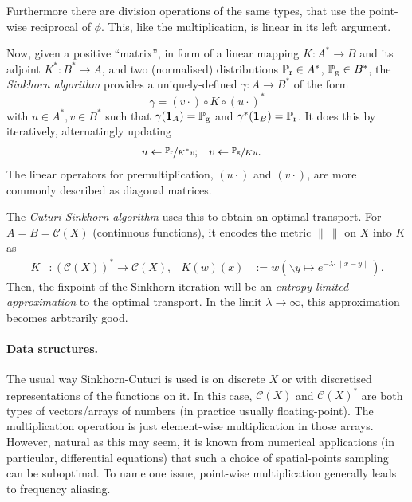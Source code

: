 \documentclass[a4paper]{easychair}
\begin{document}
Furthermore there are division operations of the same types, that use the point-wise reciprocal of $\phi$. This, like the multiplication, is linear in its left argument.

Now, given a positive “matrix”, in form of a linear mapping $K: A^\ast\to B$ and its adjoint $K^\ast: B^\ast\to A$, and two (normalised) distributions $\mathbb{P}_\mathrm{r}\in A^\ast$, $\mathbb{P}_\mathrm{g}\in B^\ast$, the \emph{Sinkhorn algorithm} \cite{SinkhornDiagEquivlc} provides a uniquely-defined $\gamma: A\to B^\ast$ of the form
\[
  \gamma = (v\cdot) \circ K \circ (u\cdot)^\ast
\]
with $u\in A^\ast, v\in B^\ast$ such that $\gamma(\mathbf{1}_A)=\mathbb{P}_\mathrm{g}$ and $\gamma^\ast(\mathbf{1}_B)=\mathbb{P}_\mathrm{r}$. It does this by iteratively, alternatingly updating
\[\begin{aligned}
  u &\leftarrow \sfrac{\mathbb{P}_\mathrm{r}}{K^\ast v};
   & v &\leftarrow \sfrac{\mathbb{P}_\mathrm{g}}{K u}.
\end{aligned}\]
The linear operators for premultiplication, $(u\cdot)$ and $(v\cdot)$, are more commonly described as diagonal matrices.

The \emph{Cuturi-Sinkhorn algorithm} \cite{CuturiSinkhornLightspeed} uses this to obtain an optimal transport. For $A=B=\mathcal{C}(X)$ (continuous functions), it encodes the metric $\|\ \|$ on $X$ into $K$ as
\[\begin{aligned}
  K&:(\mathcal{C}(X))^\ast \to \mathcal{C}(X), & K(w)(x) &:= w(\backslash y \mapsto e^{-\lambda\cdot\|x-y\|}).
\end{aligned}\]
Then, the fixpoint of the Sinkhorn iteration will be an \emph{entropy-limited approximation} to the optimal transport. In the limit $\lambda\to\infty$, this approximation becomes arbtrarily good.


\paragraph{Data structures.}
The usual way Sinkhorn-Cuturi is used is on discrete $X$ or with discretised representations of the functions on it. In this case, $\mathcal{C}(X)$ and $\mathcal{C}(X)^\ast$ are both types of vectors/arrays of numbers (in practice usually floating-point). The multiplication operation is just element-wise multiplication in those arrays.
However, natural as this may seem, it is known from numerical applications (in particular, differential equations) that such a choice of spatial-points sampling can be suboptimal. To name one issue, point-wise multiplication generally leads to frequency aliasing.
\end{document}
